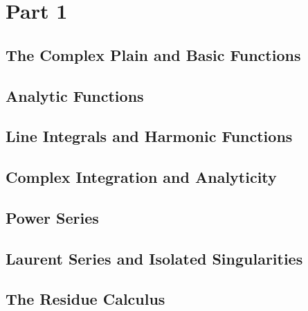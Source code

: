\documentclass[12pt, a4paper, oneside, openright, titlepage]{book}
\begin{document}
\tableofcontents


\part{Part 1}

\chapter{The Complex Plain and Basic Functions}






\chapter{Analytic Functions}



\chapter{Line Integrals and Harmonic Functions}



\chapter{Complex Integration and Analyticity}



\chapter{Power Series}




\chapter{Laurent Series and Isolated Singularities}



\chapter{The Residue Calculus}
\end{document}
